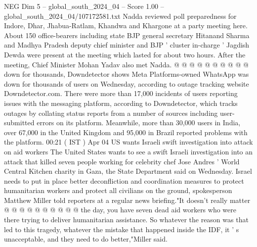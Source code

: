 \begin{textsample}{NEG Dim 5 – global\_south\_2024\_04 – Score 1.00 – global\_south\_2024\_04/107172581.txt}
Nadda reviewed poll preparedness for Indore, Dhar, Jhabua-Ratlam, Khandwa and Khargone at a party meeting here.
About 150 office-bearers including state BJP general secretary Hitanand Sharma and Madhya Pradesh deputy chief minister and BJP ' cluster in-charge ' Jagdish Dewda were present at the meeting which lasted for about two hours.
After the meeting, Chief Minister Mohan Yadav also met Nadda. @ @ @ @ @ @ @ @ @ @ down for thousands, Downdetector shows Meta Platforms-owned WhatsApp was down for thousands of users on Wednesday, according to outage tracking website Downdetector.com.
There were more than 17,000 incidents of users reporting issues with the messaging platform, according to Downdetector, which tracks outages by collating status reports from a number of sources including user-submitted errors on its platform.
Meanwhile, more than 30,000 users in India, over 67,000 in the United Kingdom and 95,000 in Brazil reported problems with the platform. 00:21 ( IST ) Apr 04 US wants Israeli swift investigation into attack on aid workers The United States wants to see a swift Israeli investigation into an attack that killed seven people working for celebrity chef Jose Andres ' World Central Kitchen charity in Gaza, the State Department said on Wednesday.
Israel needs to put in place better deconfliction and coordination measures to protect humanitarian workers and protect all civilians on the ground, spokesperson Matthew Miller told reporters at a regular news briefing."It doesn't really matter @ @ @ @ @ @ @ @ @ @ the day, you have seven dead aid workers who were there trying to deliver humanitarian assistance.
So whatever the reason was that led to this tragedy, whatever the mistake that happened inside the IDF, it ' s unacceptable, and they need to do better,"Miller said.

\end{textsample}
